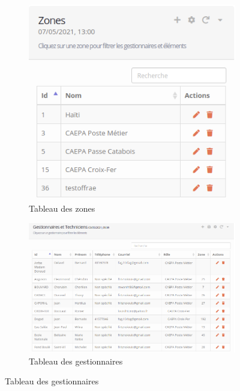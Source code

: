 \documentclass{EPL-master-thesis-covers-FR}
\begin{document}
				
				\begin{figure}[H]
					\begin{subfigure}[b]{0.3\textwidth}
  						\includegraphics[width=1\linewidth]{images/gestion_tab1}
  						\caption{Tableau des zones}
					\end{subfigure}%
					\begin{subfigure}[b]{0.7\textwidth}
  						\includegraphics[width=1\linewidth]{images/gestion_tab2}
  						\caption{Tableau des gestionnaires}
					\end{subfigure}
					\label{fig:test}
				\end{figure}
			
\end{document}
